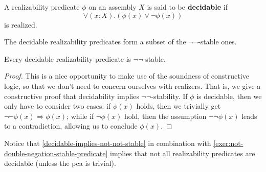 \begin{definition}[Decidability]
  A realizability predicate \(\phi\) on an assembly \(X\) is said to be
  \textbf{decidable} if
  \[
    \forall(x : X).(\phi(x) \lor \lnot\phi(x))
  \]
  is realized.
\end{definition}

The decidable realizability predicates form a subset of the \(\lnot\lnot\)-stable ones.

\begin{lemma}\label{decidable-implies-not-not-stable}
  Every decidable realizability predicate is \(\lnot\lnot\)-stable.
\end{lemma}
\begin{proof}
  This is a nice opportunity to make use of the soundness of constructive logic,
  so that we don't need to concern ourselves with realizers.
  That is, we give a constructive proof that decidability implies
  \(\lnot\lnot\)-stability.
  If \(\phi\) is decidable, then we only have to consider two cases: if
  \(\phi(x)\) holds, then we trivially get
  \(\lnot\lnot\phi(x) \Rightarrow \phi(x)\); while if \(\lnot\phi(x)\) hold,
  then the assumption \(\lnot\lnot\phi(x)\) leads to a contradiction, allowing
  us to conclude \(\phi(x)\).
\end{proof}

Notice that \cref{decidable-implies-not-not-stable} in combination with
\cref{exer:not-double-negation-stable-predicate} implies that not all
realizability predicates are decidable (unless the pca is trivial).


